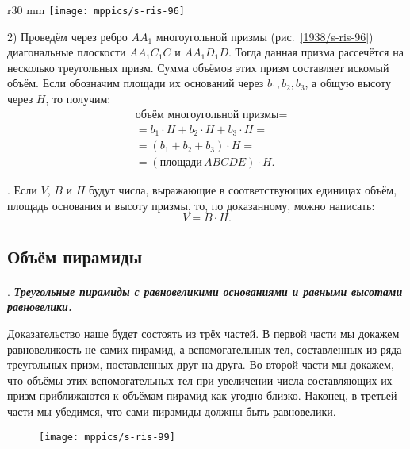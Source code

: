 \begin{wrapfigure}[12]{r}{30 mm}
\vskip0mm
\centering
\texttt{[image: mppics/s-ris-96]}
\caption{}\label{1938/s-ris-96}
\vskip-0mm
\end{wrapfigure}

2) Проведём через ребро $AA_1$ многоугольной призмы (рис.~\ref{1938/s-ris-96}) диагональные плоскости $AA_1C_1C$ и $AA_1D_1D$.
Тогда данная призма рассечётся на несколько треугольных призм.
Сумма объёмов этих призм составляет искомый объём.
Если обозначим площади их оснований через $b_1,b_2,b_3$, а общую высоту через $H$, то получим: 
\begin{align*}
&\text{объём многоугольной призмы}=
\\
&= b_1\cdot H + b_2 \cdot H+ b_3\cdot H=
\\
&=(b_1+ b_2+b_3)\cdot H = 
\\
&=(\text{площади}\, ABCDE)\cdot H.
\end{align*}

\mbox{.}
Если $V$, $B$ и $H$ будут числа, выражающие в соответствующих единицах объём, площадь основания и высоту призмы, то, по доказанному, можно написать:
\[V = B\cdot H.\]



\subsection*{Объём пирамиды}

\paragraph{}\label{1938/s90}
.
\textbf{\emph{Треугольные пирамиды с равновеликими основаниями и равными высотами равновелики.}}

Доказательство наше будет состоять из трёх частей.
В первой части мы докажем равновеликость не самих пирамид, а вспомогательных тел, составленных из ряда треугольных призм, поставленных друг на друга.
Во второй части мы докажем, что объёмы этих вспомогательных тел при увеличении числа составляющих их призм приближаются к объёмам пирамид как угодно близко.
Наконец, в третьей части мы убедимся, что сами пирамиды должны быть равновелики.

\begin{figure}[h!]
\vskip-0mm
\centering
\texttt{[image: mppics/s-ris-99]}
\caption{}\label{1938/s-ris-99}
\vskip-0mm
\end{figure}

